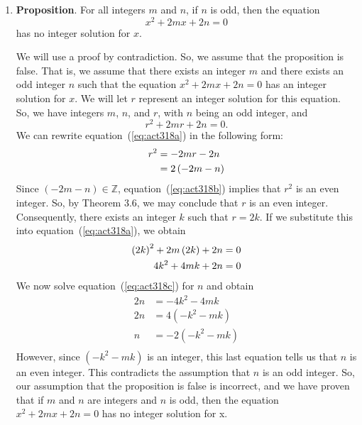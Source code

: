 \documentclass[11pt]{article}
\begin{document}
\begin{enumerate}
\item
\noindent
\textbf{Proposition}.  For all integers $m$ and $n$, if $n$ is odd, then the equation
   \[
   x^2+2mx+2n=0
   \]
   has no integer solution for $x$.
\begin{myproof}
We will use a proof by contradiction.  So, we assume that the proposition is false.  That is, we assume that there exists an integer  $m$  and there exists an odd integer $n$  such that the equation $x^2  + 2mx + 2n = 0$ has an integer solution for  $x$.  We will let  $r$ represent an integer solution for this equation.  So, we have integers  $m$, $n$, and  $r$, with  $n$  being an odd integer, and
\setcounter{equation}{0}
\begin{equation} \label{eq:act318a}
r^2  + 2mr + 2n = 0.
\end{equation}
We can rewrite equation~(\ref{eq:act318a}) in the following form:
\begin{align}
  r^2  &=  - 2mr - 2n \notag \\ 
       &= 2\left( { - 2m - n} \right) \label{eq:act318b} 
\end{align} 
Since  $\left( { - 2m - n} \right) \in \mathbb{Z}$, equation~(\ref{eq:act318b}) implies that  
$r^2 $ is an even integer.  So, by Theorem 3.6, we may conclude that  $r$  is an even integer.  Consequently, there exists an integer  $k$  such that  $r = 2k$.  If we substitute this into equation~(\ref{eq:act318a}), we obtain
\begin{align}
  \left( {2k} \right)^2  + 2m\left( {2k} \right) + 2n &= 0 \notag \\ 
                                     4k^2  + 4mk + 2n &= 0 \label{eq:act318c} 
\end{align}
We now solve equation~(\ref{eq:act318c}) for  $n$ and obtain
\[
\begin{aligned}
  2n &=  - 4k^2  - 4mk \\ 
  2n &= 4\left( { - k^2  - mk} \right) \\ 
   n &=  - 2\left( { - k^2  - mk} \right) \\ 
\end{aligned} 
\]
However, since  $\left( { - k^2  - mk} \right)$ is an integer, this last equation tells us that  
$n$  is an even integer.  This contradicts the assumption that  $n$  is an odd integer.  So, our assumption that the proposition is false is incorrect, and we have proven that if  $m$  and  $n$  are integers and  $n$  is odd, then the equation  $x^2  + 2mx + 2n = 0$ has no integer solution for  x.
\end{myproof}
\end{enumerate}
\end{document}
